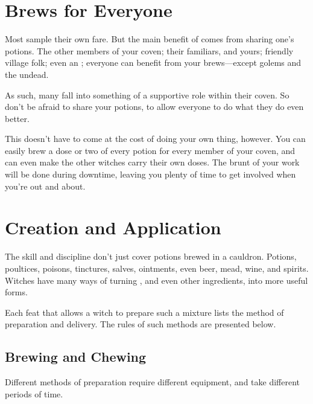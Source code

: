 \section{Brews for Everyone}

Most  sample their own fare.
But the main benefit of  comes from sharing one's potions.
The other members of your coven; their familiars, and yours; friendly village folk; even an ; everyone can benefit from your brews---except golems and the undead.

As such, many  fall into something of a supportive role within their coven.
So don't be afraid to share your potions, to allow everyone to do what they do even better.

This doesn't have to come at the cost of doing your own thing, however.
You can easily brew a dose or two of every potion for every member of your coven, and can even make the other witches carry their own doses.
The brunt of your  work will be done during downtime, leaving you plenty of time to get involved when you're out and about.

\section{Creation and Application}

The  skill and  discipline don't just cover potions brewed in a cauldron.
Potions, poultices, poisons, tinctures, salves, ointments, even beer, mead, wine, and spirits.
Witches have many ways of turning , and even other ingredients, into more useful forms.

Each feat that allows a witch to prepare such a mixture lists the method of preparation and delivery.
The rules of such methods are presented below.

\subsection{Brewing and Chewing}

Different methods of preparation require different equipment, and take different periods of time.


